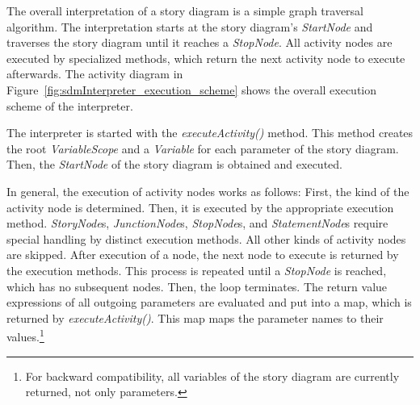 The overall interpretation of a story diagram is a simple graph traversal algorithm.
The interpretation starts at the story diagram's \emph{StartNode} and traverses the story diagram until it reaches a \emph{StopNode}. 
All activity nodes are executed by specialized methods, which return the next activity node to execute afterwards. The activity diagram in Figure~\ref{fig:sdmInterpreter_execution_scheme} shows the overall execution scheme of the interpreter.

The interpreter is started with the \emph{executeActivity()} method.
This method creates the root \emph{VariableScope} and a \emph{Variable} for each parameter of the story diagram.
Then, the \emph{StartNode} of the story diagram is obtained and executed.

In general, the execution of activity nodes works as follows: 
First, the kind of the activity node is determined. Then, it is executed by the appropriate execution method.
\emph{StoryNode}s, \emph{JunctionNode}s, \emph{StopNode}s, and \emph{StatementNode}s require special handling by distinct execution methods.
All other kinds of activity nodes are skipped.
After execution of a node, the next node to execute is returned by the execution methods.
This process is repeated until a \emph{StopNode} is reached, which has no subsequent nodes.
Then, the loop terminates. The return value expressions of all outgoing parameters are evaluated and put into a map, which is returned by \emph{executeActivity()}.
This map maps the parameter names to their values.\footnote{For backward compatibility, all variables of the story diagram are currently returned, not only parameters.}

